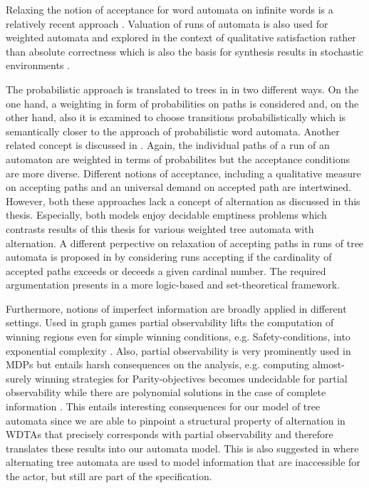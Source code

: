 Relaxing the notion of acceptance for word automata on infinite words is a
relatively recent approach \cite{PBAcoin,Groesser,RecOmeLangProbAuto,%
DecProblemsForProbAuto}. Valuation of runs of automata is also used for
weighted automata \cite{MaxSumSemanticsWeightedAutomata} and explored in the
context of qualitative satisfaction rather than absolute correctness
\cite{DecWeightedAutomata} which is also the basis for synthesis results in
stochastic environments \cite{HighQualSynStochEnv}.

The probabilistic approach is translated to trees in \cite{RandAutoInfTrees,%
QualTreeLang} in two different ways. On the one hand, a weighting in form of
probabilities on paths is considered and, on the other hand, also it is
examined to choose transitions probabilistically which is semantically closer
to the approach of probabilistic word automata. Another related concept is
discussed in \cite{EmptinessInZeroAutoDecidable}. Again, the individual paths
of a run of an automaton are weighted in terms of probabilites but the
acceptance conditions are more diverse. Different notions of acceptance,
including a qualitative measure on accepting paths and an universal demand on
accepted path are intertwined. However, both these approaches lack a concept of
alternation as discussed in this thesis. Especially, both models enjoy
decidable emptiness problems which contrasts results of this thesis for various
weighted tree automata with alternation. A different perpective on relaxation
of accepting paths in runs of tree automata is proposed in
\cite{CardinalsForTreePaths} by considering runs accepting if the cardinality
of accepted paths exceeds or deceeds a given cardinal number. The required
argumentation presents in a more logic-based and set-theoretical framework.

Furthermore, notions of imperfect information are broadly applied in different
settings. Used in graph games partial observability lifts the computation of
winning regions even for simple winning conditions, e.g. Safety-conditions,
into exponential complexity \cite{PowerOfImperfectInformation}. Also, partial
observability is very prominently used in \aclp*{MDP} \cite{RandomnessForFree,%
ActingOptimallyInPOSD, QualAnaPOMDP} but entails harsh consequences on the
analysis, e.g. computing almost-surely winning strategies for Parity-objectives
becomes undecidable for partial observability while there are polynomial
solutions in the case of complete information \cite{QualAnaPOMDP,%
QuanStochParityGames, ContrSynProbSys}. This entails interesting consequences
for our model of tree automata since we are able to pinpoint a structural
property of alternation in \aclp*{WDTA} that precisely corresponds with partial
observability and therefore translates these results into our automata model.
This is also suggested in \cite{ChurchsProblemRevisited} where alternating tree
automata are used to model information that are inaccessible for the actor, but
still are part of the specification.

